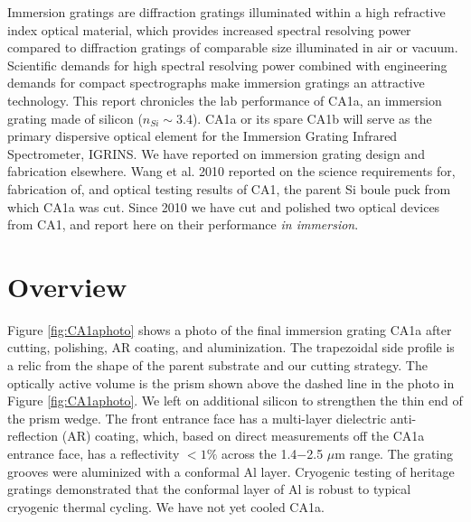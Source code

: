 \documentclass[]{spie}
\begin{document}
Immersion gratings are diffraction gratings illuminated within a high refractive index optical material, which provides increased spectral resolving power compared to diffraction gratings of comparable size illuminated in air or vacuum.  Scientific demands for high spectral resolving power combined with engineering demands for compact spectrographs make immersion gratings an attractive technology.  This report chronicles the lab performance of CA1a, an immersion grating made of silicon ($n_{Si}\sim3.4$).  CA1a or its spare CA1b will serve as the primary dispersive optical element for the Immersion Grating Infrared Spectrometer, IGRINS\cite{yuk2010}.  We have reported on immersion grating design and fabrication elsewhere\cite{marsh2007}.  Wang et al. 2010\cite{wang2010} reported on the science requirements for, fabrication of, and optical testing results of CA1, the parent Si boule puck from which CA1a was cut.  Since 2010 we have cut and polished two optical devices from CA1, and report here on their performance \emph{in immersion}.

\section{Overview} 
Figure \ref{fig:CA1aphoto} shows a photo of the final immersion grating CA1a after cutting, polishing, AR coating, and aluminization.  The trapezoidal side profile is a relic from the shape of the parent substrate and our cutting strategy.  The optically active volume is the prism shown above the dashed line in the photo in Figure \ref{fig:CA1aphoto}.  We left on additional silicon to strengthen the thin end of the prism wedge.  The front entrance face has a multi-layer dielectric anti-reflection (AR) coating, which, based on direct measurements off the CA1a entrance face, has a reflectivity  $<1\%$ across the 1.4$-$2.5 $\mu$m range.  The grating grooves were aluminized with a conformal Al layer.  Cryogenic testing of heritage gratings demonstrated that the conformal layer of Al is robust to typical cryogenic thermal cycling\cite{marsh2007}. We have not yet cooled CA1a.
\end{document}
